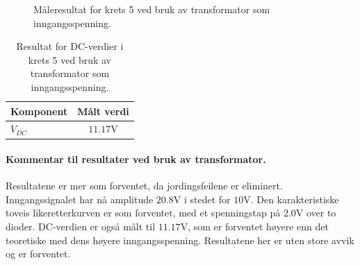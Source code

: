 \begin{figure}[H]
\centering
{}
\caption{Måleresultat for krets 5 ved bruk av transformator som inngangsspenning.}\label{fig:resultat_krets5_med_transformator}
\end{figure}

\begin{table}[H]
\centering
\caption{Resultat for DC-verdier i krets 5 ved bruk av transformator som inngangsspenning.}
\label{tab:krets5_dc_verdi_transformator}
\begin{tabular}{lc}
\toprule
\textbf{Komponent}& \textbf{Målt verdi} \\
\midrule

$V_{DC}$ & $11.17\text{V}$ \\



\bottomrule
\end{tabular}
\end{table}

\paragraph{Kommentar til resultater ved bruk av transformator. } Resultatene er mer som forventet, da jordingsfeilene er eliminert. Inngangssignalet har nå amplitude $20.8\mathrm{V}$ i stedet for $10\mathrm{V}$. Den karakteristiske toveis likeretterkurven er som forventet, med et spenningstap på $2.0\mathrm{V}$ over to dioder. DC-verdien er også målt til $11.17\mathrm{V}$, som er forventet høyere enn det teoretiske med dens høyere inngangsspenning. Resultatene her er uten store avvik og er forventet.

